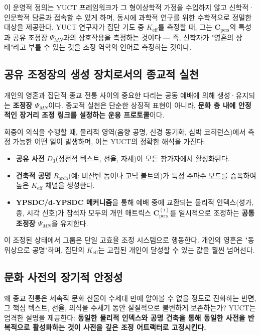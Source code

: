 \documentclass[12pt,a4paper]{article}
\begin{document}
	이 운영적 정의는 YUCT 프레임워크가 그 형이상학적 가정을 수입하지 않고 신학적·인문학적 담론과 접속할 수 있게 하며, 동시에 과학적 연구를 위한 수학적으로 정밀한 대상을 제공한다. YUCT 연구자가 집단 기도 중 \(K_{\mathrm{eff}}\)를 측정할 때, 그는 \(\mathbf{C}_{\text{pers}}\)의 특성과 공유 조정장 \(\Psi_{MN}\)과의 상호작용을 측정하는 것이다 — 즉, 신학자가 "영혼의 상태"라고 부를 수 있는 것을 조정 역학의 언어로 측정하는 것이다.
	
	\subsection{공유 조정장의 생성 장치로서의 종교적 실천}
	
	개인의 영혼과 집단적 종교 전통 사이의 중요한 다리는 공동 예배에 의해 생성·유지되는 \textbf{조정장 \(\Psi_{MN}\)}이다. 종교적 실천은 단순한 상징적 표현이 아니라, \textbf{문화 층 내에 안정적인 장거리 조정 링크를 설정하는 운용 프로토콜}이다.
	
	회중이 의식을 수행할 때, 물리적 영역(음향 공명, 신경 동기화, 심박 코히런스)에서 측정 가능한 어떤 일이 발생하며, 이는 YUCT의 정확한 해석을 가진다:
	\begin{itemize}
		\item \textbf{공유 사전} \(D_3\)(정전적 텍스트, 선율, 자세)이 모든 참가자에서 활성화된다.
		\item \textbf{건축적 공명} \(R_{\mathrm{arch}}\)(예: 비잔틴 돔이나 고딕 볼트의)가 특정 주파수 모드를 증폭하여 높은 \(K_{\mathrm{eff}}\) 채널을 생성한다.
		\item \textbf{YPSDC/d‑YPSDC 메커니즘}을 통해 예배 중에 교환되는 물리적 인덱스(성가, 종, 시각 신호)가 참석자 모두의 개인 매트릭스 \(\mathbf{C}_{\text{pers}}^{(i)}\)를 일시적으로 조정하는 \textbf{공통 조정장 \(\Psi_{MN}\)}을 유지한다.
	\end{itemize}
	
	이 조정된 상태에서 그룹은 단일 고효율 조정 시스템으로 행동한다. 개인의 영혼은 "동위상으로 공명"하며, 집단의 \(K_{\mathrm{eff}}\)는 고립된 개인이 달성할 수 있는 값을 훨씬 넘어선다.
	
	\subsection{문화 사전의 장기적 안정성}
	
	왜 종교 전통은 세속적 문화 산물이 수세대 만에 알아볼 수 없을 정도로 진화하는 반면, 그 핵심 텍스트, 선율, 의식을 수세기 동안 실질적으로 불변하게 보존하는가? YUCT는 엄격한 설명을 제공한다: \textbf{동일한 물리적 인덱스와 공명 건축을 통해 동일한 사전을 반복적으로 활성화하는 것이 사전을 깊은 조정 어트랙터로 고정시킨다.}
	
\end{document}
